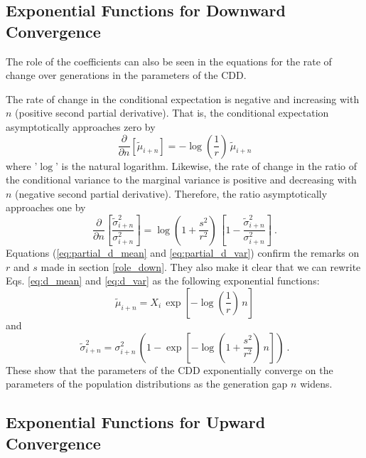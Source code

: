 \documentclass{svproc} %
\begin{document}
\subsection{Exponential Functions for Downward Convergence}

The role of the coefficients can also be seen in the equations for the rate of change over generations in the parameters of the CDD. 

The rate of change in the conditional expectation is negative and increasing with $n$ (positive second partial derivative). That is, the conditional expectation asymptotically approaches zero by 
\begin{equation}
\frac{\partial }{\partial n}[\tilde{\mu}_{i+n}] = -\log(\frac{1}{r}) \, \tilde{\mu}_{i+n}
\label{eq:partial_d_mean}
\end{equation}
where '$\log$' is the natural logarithm. Likewise, the rate of change in the ratio of the conditional variance to the marginal variance is positive and decreasing with $n$ (negative second partial derivative). Therefore, the ratio asymptotically approaches one by 
\begin{equation}
\frac{\partial }{\partial n}[\frac{\tilde{\sigma}_{i+n}^2}{\sigma_{i+n}^2}] = \log(1+\frac{s^2}{r^2}) \, [1 - \frac{\tilde{\sigma}_{i+n}^2}{\sigma_{i+n}^2}] \ .
\label{eq:partial_d_var}
\end{equation}
Equations (\ref{eq:partial_d_mean} and \ref{eq:partial_d_var}) confirm the remarks on $r$ and $s$ made in section \ref{role_down}. They also make it clear that we can rewrite Eqs. \ref{eq:d_mean} and \ref{eq:d_var} as the following exponential functions:
\begin{equation}
\tilde{\mu}_{i+n} = X_i \, \exp[-\log(\frac{1}{r}) \, n]
\label{eq:expo_d_mean}
\end{equation}
and 
\begin{equation}
\tilde{\sigma}_{i+n}^2 = \sigma_{i+n}^2 \, (1 - \exp[-\log(1+\frac{s^2}{r^2}) \, n]) \ .
\label{eq:expo_d_var}
\end{equation}
These show that the parameters of the CDD exponentially converge on the parameters of the population distributions as the generation gap $n$ widens. 


\subsection{Exponential Functions for Upward Convergence}
\end{document}
